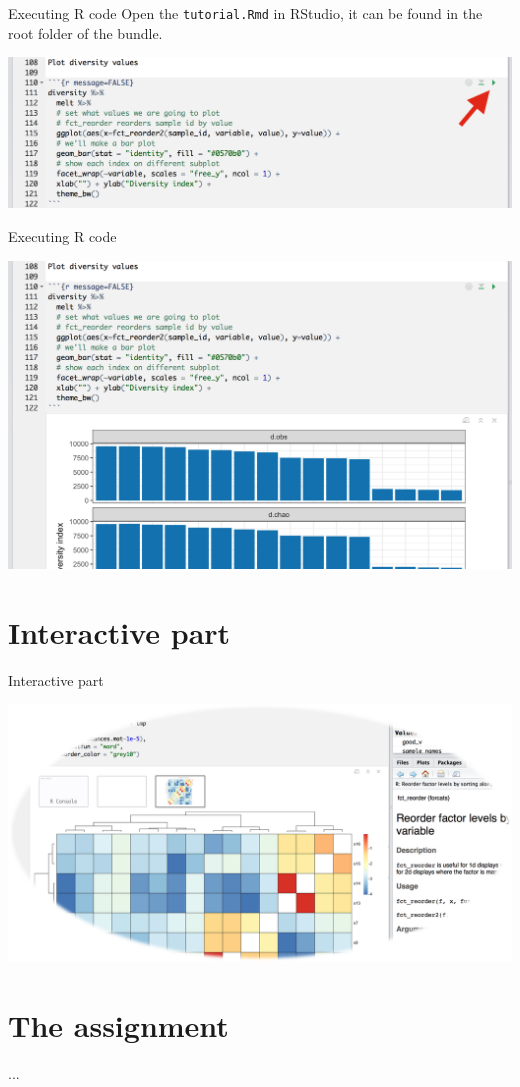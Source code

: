 \documentclass[12pt]{beamer}
\begin{document}
\begin{frame}{Executing R code}
Open the \texttt{tutorial.Rmd} in RStudio, it can be found in the root folder of the bundle.
\begin{center}
\includegraphics[width=\textwidth]{p8}
\end{center}
\end{frame}

\begin{frame}{Executing R code}
\begin{center}
\includegraphics[width=\textwidth]{p9}
\end{center}
\end{frame}

\section{Interactive part}

\begin{frame}{Interactive part}
\begin{center}
\includegraphics[width=\textwidth]{../splash}
\end{center}
\end{frame}

\section{The assignment}

\begin{frame}{...}
\end{frame}
\end{document}
